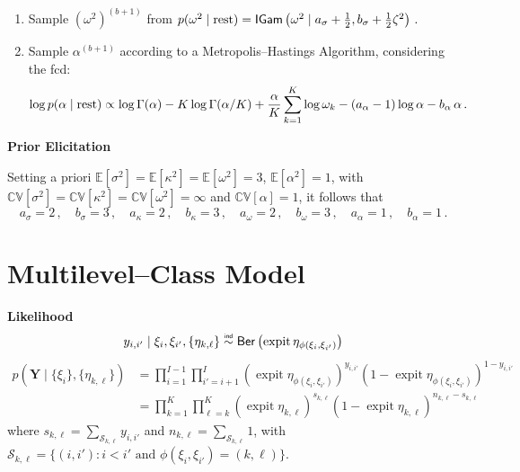 \documentclass[letterpaper,12pt,openany]{article}
\def\frac#1#2{{{#1}\over{#2}}}
\def\le{\left}
\def\ri{\right}
\DeclareMathOperator*{\expit}{expit}
\newcommand\simind{\mathrel{\overset{\makebox[0pt]{\mbox{\normalfont\tiny\sffamily ind}}}{\sim}}}
\newcommand{\expec}[1]{\mathbb{E}\left[#1\right]}
\newcommand{\CV}[1]{\mathbb{C}\mathbb{V}\left[#1\right]}
\def\Ber{\small{\mathsf{Ber}}}
\def\IGamd{\small{\mathsf{IGam}}}
\def\rest{\text{rest}}
\def\Y{\mathbf{Y}}\def\y{\mathbf{y}}\def\Yv{\boldsymbol{Y}}\def\yv{\boldsymbol{y}}
\def\al{\alpha}\def\alv{\boldsymbol{\alpha}}
\def\sig{\sigma}\def\sigv{\boldsymbol{\sigma}}
\def\ome{\omega}
\def\kap{\kappa}
\begin{document}
\begin{enumerate}
	\item Sample $(\ome^2)^{(b+1)}$ from
	$p(\ome^2\mid\rest) = \IGamd\le(\ome^2 \mid a_\sig + \tfrac12, b_\sig + \tfrac12 \zeta^2 \ri)\,.$
	
	\item Sample $\alpha^{(b+1)}$ according to a Metropolis--Hastings Algorithm, considering the fcd:
	\begin{align*}
	\log p(\alpha\mid\rest)
	&\propto
	\log\Gamma(\alpha) - K\log\Gamma(\alpha/K) + \frac{\al}{K}\sum_{k=1}^K\log\omega_k - (a_\al-1)\log\al - b_\al\,\al\,.
	\end{align*}
	
\end{enumerate}


\textbf{Prior Elicitation} 

Setting a priori $\expec{\sigma^2} =\expec{\kappa^2} = \expec{\omega^2} = 3$, $\expec{\alpha^2} = 1$, with $\CV{\sigma^2} = \CV{\kappa^2} = \CV{\omega^2} = \infty$ and $\CV{\al} = 1$, it follows that
$$
a_\sig = 2\,,\quad b_\sig = 3  \,,\quad 
a_\kap = 2\,,\quad b_\kap = 3  \,,\quad
a_\ome = 2\,,\quad b_\ome = 3  \,,\quad
a_\alpha = 1\,,\quad b_\alpha = 1\,.
$$

\section{Multilevel--Class Model}

\textbf{Likelihood}
$$
y_{i,i'}\mid \xi_i,\xi_{i'}, \{\eta_{k,\ell}\} \simind \Ber\left( \expit \eta_{\phi(\xi_i,\xi_{i'})}  \right)
$$
\begin{align*}
p(\Y\mid\{\xi_{i}\},\{\eta_{k,\ell}\}) &= \prod_{i=1}^{I-1}\prod_{i'=i+1}^I(\expit \eta_{\phi(\xi_i,\xi_{i'})})^{y_{i,i'}}(1-\expit \eta_{\phi(\xi_i,\xi_{i'})})^{1-y_{i,i'}} \\
&=\prod_{k=1}^{K}\prod_{\ell=k}^K (\expit \eta_{k,\ell})^{s_{k,\ell}}(1-\expit \eta_{k,\ell})^{n_{k,\ell}-s_{k,\ell}}
\end{align*}
where $s_{k,\ell} = \sum_{\mathcal{S}_{k,\ell}} y_{i,i'}$ and $n_{k,\ell} = \sum_{\mathcal{S}_{k,\ell}} 1$, with $\mathcal{S}_{k,\ell} = \{(i,i'):i<i'\text{ and }\phi(\xi_i,\xi_{i'})=(k,\ell)\}$.
\end{document}
